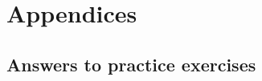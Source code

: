 
\frontmatter






\tableofcontents*

\mainmatter





%




%


\appendix
\part*{Appendices}


\chapter{Answers to practice exercises}
\label{ch:answers}
\PrintCollectedPracticeWithAnswers


 
%


%
\backmatter




